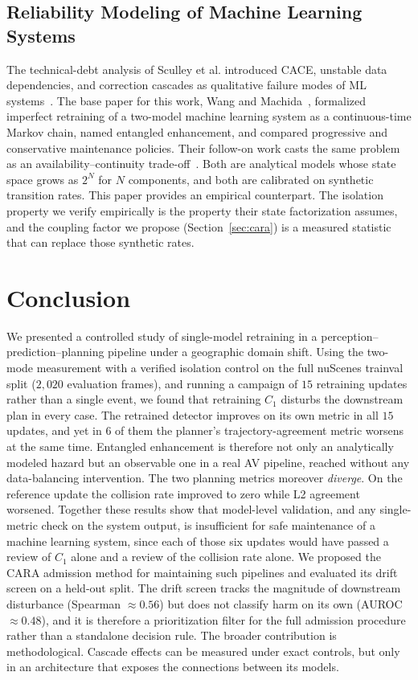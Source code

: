 \documentclass[conference]{IEEEtran}
\begin{document}
\subsection{Reliability Modeling of Machine Learning Systems}
The technical-debt analysis of Sculley et al. introduced CACE, unstable data
dependencies, and correction cascades as qualitative failure modes of ML
systems~\cite{sculley2015hidden}. The base paper for this work, Wang and
Machida~\cite{wang2024compsac}, formalized imperfect retraining of a
two-model machine learning system as a continuous-time Markov chain, named entangled
enhancement, and compared progressive and conservative maintenance policies.
Their follow-on work casts the same problem as an availability--continuity
trade-off~\cite{wang2025issre}. Both are analytical models whose state space
grows as $2^N$ for $N$ components, and both are calibrated on synthetic
transition rates. This paper provides an empirical counterpart. The isolation
property we verify empirically is the property their state factorization assumes, and
the coupling factor we propose (Section~\ref{sec:cara}) is a measured statistic
that can replace those synthetic rates.


\section{Conclusion}
\label{sec:conclusion}
We presented a controlled study of single-model retraining in a
perception--prediction--planning pipeline under a geographic domain shift. Using
the two-mode measurement with a verified isolation control on the full nuScenes
trainval split ($2{,}020$ evaluation frames), and running a campaign of $15$
retraining updates rather than a single event, we found that retraining $C_1$
disturbs the downstream plan in every case. The retrained detector improves on
its own metric in all $15$ updates, and yet in $6$ of them the planner's
trajectory-agreement metric worsens at the same time. Entangled enhancement is
therefore not only an analytically modeled hazard but an observable one in a real
AV pipeline, reached without any data-balancing intervention. The two planning
metrics moreover \emph{diverge}. On the reference update the collision rate
improved to zero while L2 agreement worsened. Together these results
show that model-level validation, and any single-metric check on the system
output, is insufficient for safe maintenance of a machine learning system, since each of those six updates
would have passed a review of $C_1$ alone and a review of the collision rate alone. We proposed the CARA admission method for
maintaining such pipelines and evaluated its drift screen on a
held-out split. The drift screen tracks the magnitude of downstream disturbance
(Spearman $\approx 0.56$) but does not classify harm on its own (AUROC $\approx
0.48$), and it is therefore a prioritization filter for the full admission
procedure rather than a standalone decision rule. The broader contribution is
methodological. Cascade effects can be measured under exact controls, but only in
an architecture that exposes the connections between its models.



\end{document}
